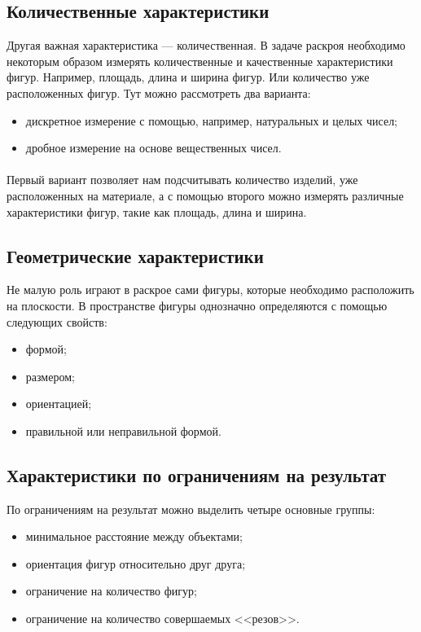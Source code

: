 \documentclass[14pt]{extarticle}
\begin{document}
	\subsection{Количественные характеристики}
	Другая важная характеристика --- количественная. В задаче раскроя необходимо
	некоторым образом измерять количественные и качественные характеристики фигур.
	Например, площадь, длина и ширина фигур. Или количество уже расположенных фигур. Тут можно рассмотреть два варианта:
	\begin{itemize}
		\item дискретное измерение с помощью, например, натуральных и целых чисел;
		\item дробное измерение на основе вещественных чисел.
	\end{itemize}
	\paragraph{}
	Первый вариант позволяет нам подсчитывать количество изделий, уже расположенных
	на материале, а с помощью второго можно измерять различные характеристики фигур, 	такие как площадь, длина и ширина.
	\subsection{Геометрические характеристики}
	Не малую роль играют в раскрое сами фигуры, которые необходимо расположить
	на плоскости. В пространстве фигуры однозначно определяются с помощью следующих
	свойств:
	\begin{itemize}
		\item формой;
		\item размером;
		\item ориентацией;
		\item правильной или неправильной формой.
	\end{itemize}
	\subsection{Характеристики по ограничениям на результат}
	По ограничениям на результат можно выделить четыре основные группы:
	\begin{itemize}
		\item  минимальное расстояние между объектами;
		\item ориентация фигур относительно друг друга;
		\item ограничение на количество фигур;
		\item ограничение на количество совершаемых <<резов>>.
	\end{itemize}
\end{document}
